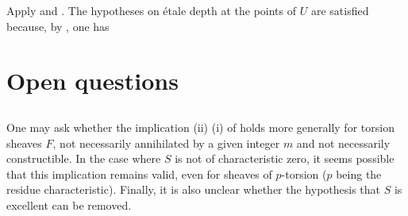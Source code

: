 Apply  and . The hypotheses on \'{e}tale depth at the points of $U$ are satisfied because, by , one has 
\enlargethispage{\baselineskip}%

\section{Open questions} \label{XIV.6}

\subsection{\texorpdfstring{}{XIV.6.1}} \label{XIV.6.1} One may ask whether the implication \textup{(ii)} \ALORS \textup{(i)} of  holds more generally for torsion sheaves $F$, not necessarily annihilated by a given integer $m$ and not necessarily constructible\unskip\marginpar{\raggedright\footnotesize\bfseries\thepageoriginal}\nobreak. In the case where $S$ is not of characteristic zero, it seems possible that this implication remains valid, even for sheaves of $p$-torsion ($p$ being the residue characteristic). Finally, it is also unclear whether the hypothesis that $S$ is excellent can be removed.

